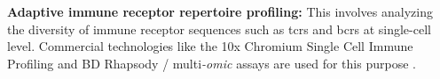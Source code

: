 


\textbf{Adaptive immune receptor repertoire profiling: }This involves analyzing the diversity of immune receptor sequences such as \glspl{tcr} and \glspl{bcr} at single-cell level. Commercial technologies like the 10x Chromium Single Cell Immune Profiling and BD Rhapsody / multi\textit{-omic} assays are used for this purpose \textbf{\cite{heumos_best_2023}}. 

